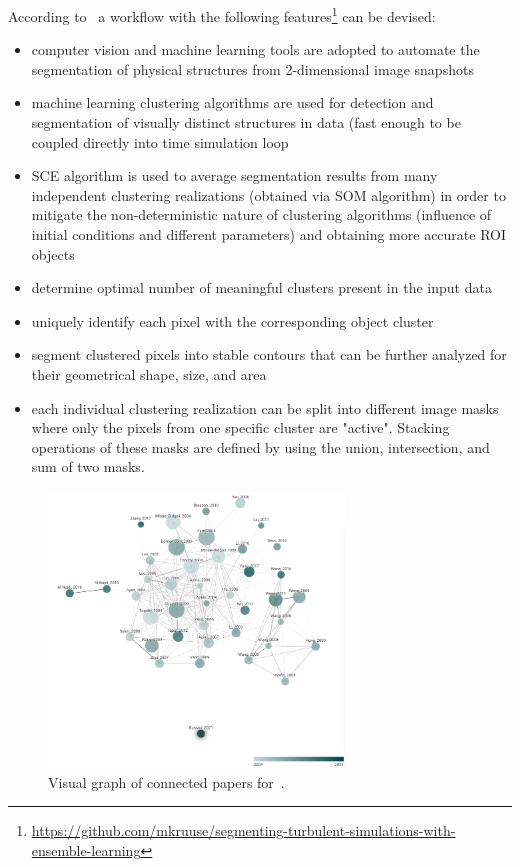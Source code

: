 \vspace{10pt}
\noindent According to~\cite{bussov2021segmentation} a workflow with the following features\footnote{\url{https://github.com/mkruuse/segmenting-turbulent-simulations-with-ensemble-learning}} can be devised:
\begin{itemize}
    \item computer vision and machine learning tools are adopted to automate the segmentation of physical structures from 2-dimensional image snapshots 
    \item machine learning clustering algorithms are used for detection and segmentation of visually distinct structures in data (fast enough to be coupled directly into time simulation loop
    \item SCE algorithm is used to average segmentation results from many independent clustering realizations (obtained via SOM algorithm) in order to mitigate the non-deterministic nature of clustering algorithms (influence of initial conditions and different parameters) and obtaining more accurate ROI objects
    \item determine optimal number of meaningful clusters present in the input data
    \item uniquely identify each pixel with the corresponding object cluster
    \item segment clustered pixels into stable contours that can be further analyzed for their geometrical shape, size, and area
    \item each individual clustering realization can be split into different image masks where only the pixels from one specific cluster are "active". Stacking operations of these masks are defined by using the union, intersection, and sum of two masks.
\end{itemize}
%
\begin{figure}[H]%
    \centering
    \includegraphics[width=0.7\textwidth]{figs/papersconnected.png}
    \caption{Visual graph of connected papers for~\cite{bussov2021segmentation}.}
    \label{fig:papersconnected}%
\end{figure}
